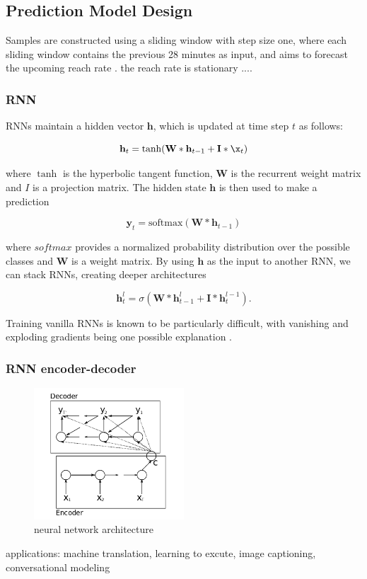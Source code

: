 \documentclass[review]{elsarticle}
\newcommand{\dabiaolv}{reach rate }
\begin{document}
\subsection{Prediction Model Design}
Samples  are  constructed  using  a  sliding  window  with step size one, where each sliding window contains the previous 28 minutes as input, and aims to forecast the upcoming \dabiaolv. the \dabiaolv is stationary ....
\subsubsection{RNN}
RNNs maintain a hidden vector $\mathbf h$, which is updated at time step $t$ as follows:
 
\begin{equation}
	\mathbf h_t = \tanh(\mathbf W * \mathbf h_{t-1} + \mathbf I * \x_t)
\end{equation}

where $\tanh$ is the hyperbolic tangent function, $\mathbf W$ is the recurrent weight matrix and $I$ is a projection matrix. The hidden state $\mathbf h$ is then used to make a prediction

\begin{equation}
	\mathbf y_t = \text{softmax}(\mathbf W * \mathbf h_{t-1})
\end{equation}

where $\textit{softmax}$ provides a normalized probability distribution over the possible classes and $\mathbf W$ is a weight matrix. By using $\mathbf h$ as the input to another RNN, we can stack RNNs, creating deeper architectures \citep{pascanu2013construct}

\begin{equation}
	\mathbf h_t^{l} = \sigma(\mathbf W * \mathbf h_{t-1}^{l} + \mathbf I * \mathbf h_t^{l-1}).
\end{equation}

Training vanilla RNNs is known to be particularly difficult, with vanishing and exploding gradients being one possible explanation \cite{pascanu2012difficulty}.

\subsubsection{RNN encoder-decoder}
\cite{ChoLearningTranslation}
\begin{figure}[h]
    \centering
    \includegraphics[width=0.5\textwidth]{RNN_encoder-decoder.png}
    \caption{neural network architecture}
    \label{fig:RNN_encoder-decoder}
\end{figure}
applications: machine translation, learning to excute, image captioning, conversational modeling
\end{document}
